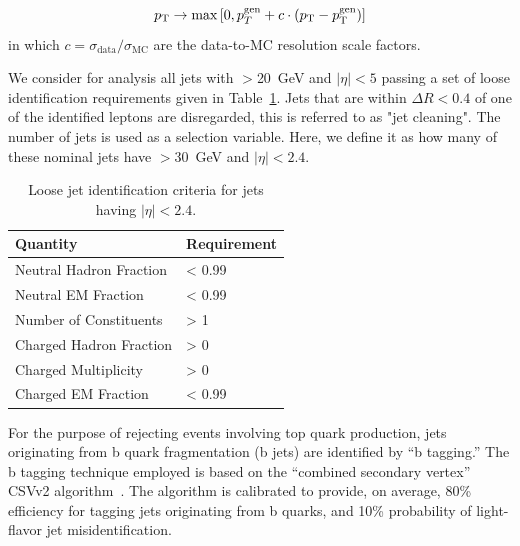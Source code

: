 \begin{equation}
p_{\rm T} \rightarrow \max \left[0 , p_{T}^{\rm gen} + c\cdot (p_{\rm T}-p_{\rm T}^{\rm gen}) \right]
\label{eq:jersmear}
\end{equation}
in which $c = \sigma_{\mathrm{data}} / \sigma_{\mathrm{MC}}$ are the data-to-MC resolution scale factors.

We consider for analysis all jets with \pt$>$20~GeV and $|\eta|<5$ passing a set of loose identification requirements given in Table~\ref{tab:loose_jet_id}.
Jets that are within $\Delta R < 0.4$ of one of the identified leptons are disregarded, this is referred to as "jet cleaning".
The number of jets is used as a selection variable.
Here, we define it as how many of these nominal jets have \pt$>$30~GeV and $|\eta|<2.4$.
\begin{table}[htbp]
  \begin{center}
 {\small
  \begin{tabular} {ll}
\hline
  Quantity                  & Requirement \\
  \hline
    Neutral Hadron Fraction   & < 0.99      \\
    Neutral EM Fraction       & < 0.99      \\
    Number of Constituents    & > 1         \\
    Charged Hadron Fraction   & > 0         \\
    Charged Multiplicity      & > 0         \\
    Charged EM Fraction       & < 0.99      \\
  \hline
  \end{tabular}
}
  \caption{Loose jet identification criteria for jets having $|\eta|<2.4$. \label{tab:loose_jet_id}}
  \end{center}
\end{table}

For the purpose of rejecting events involving top quark production, jets originating from b quark fragmentation (b jets) are identified by ``b tagging.''
The b tagging technique employed is based on the ``combined secondary vertex'' CSVv2 algorithm~\cite{Chatrchyan:2012jua}.
The algorithm is calibrated to provide, on average, 80\% efficiency for tagging jets originating from b quarks,
and 10\% probability of light-flavor jet misidentification.

